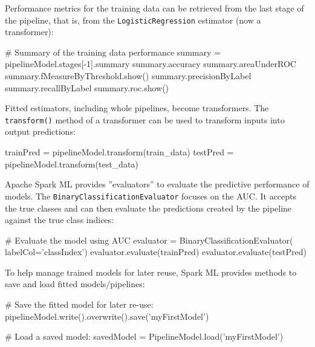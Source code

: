 Performance metrics for the training data can be retrieved from the last stage of the pipeline, that is, from the \texttt{LogisticRegression} estimator (now a transformer):

\begin{samepage}
\begin{pythoncode}
# Summary of the training data performance
summary = pipelineModel.stages[-1].summary
summary.accuracy
summary.areaUnderROC
summary.fMeasureByThreshold.show()
summary.precisionByLabel
summary.recallByLabel
summary.roc.show()
\end{pythoncode}
\end{samepage}

Fitted estimators, including whole pipelines, become transformers. The \texttt{transform()} method of a transformer can be used to transform inputs into output predictions: 

\begin{samepage}
\begin{pythoncode}
trainPred = pipelineModel.transform(train_data)
testPred = pipelineModel.transform(test_data)
\end{pythoncode}
\end{samepage}

Apache Spark ML provides ''evaluators'' to evaluate the predictive performance of models. The \texttt{BinaryClassificationEvaluator} focuses on the AUC. It accepts the true classes and can then evaluate the predictions created by the pipeline against the true class indices:

\begin{samepage}
\begin{pythoncode}
# Evaluate the model using AUC
evaluator = BinaryClassificationEvaluator(
    labelCol='classIndex')
evaluator.evaluate(trainPred)
evaluator.evaluate(testPred)
\end{pythoncode}
\end{samepage}

To help manage trained models for later reuse, Spark ML provides methods to save and load fitted models/pipelines:

\begin{samepage}
\begin{pythoncode}
# Save the fitted model for later re-use:
pipelineModel.write().overwrite().save('myFirstModel')

# Load a saved model:
savedModel = PipelineModel.load('myFirstModel')
\end{pythoncode}
\end{samepage}


